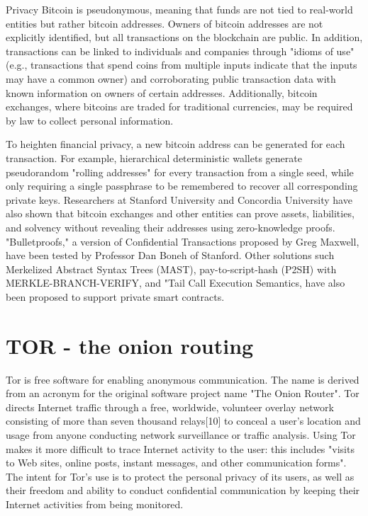 \documentclass[
  digital, %
  table,   %
  lof,     %
  lot,     %
  oneside
]{fithesis3}
\begin{document}
Privacy
Bitcoin is pseudonymous, meaning that funds are not tied to real-world entities but rather bitcoin addresses. Owners of bitcoin addresses are not explicitly identified, but all transactions on the blockchain are public. 
In addition, transactions can be linked to individuals and companies through "idioms of use" (e.g., transactions that spend coins from multiple inputs indicate that
the inputs may have a common owner) and corroborating public transaction data with known information on owners of certain addresses. Additionally, bitcoin exchanges, where bitcoins are traded for traditional
currencies, may be required by law to collect personal information.

To heighten financial privacy, a new bitcoin address can be generated for each transaction. For example, hierarchical deterministic wallets generate pseudorandom "rolling addresses"
for every transaction from a single seed, while only requiring a single passphrase to be remembered to recover all corresponding private keys. Researchers at Stanford University
and Concordia University have also shown that bitcoin exchanges and other entities can prove assets, liabilities, and solvency without revealing their addresses using zero-knowledge proofs.
"Bulletproofs," a version of Confidential Transactions proposed by Greg Maxwell, have been tested by Professor Dan Boneh of Stanford. Other solutions such Merkelized Abstract Syntax Trees (MAST),
pay-to-script-hash (P2SH) with MERKLE-BRANCH-VERIFY, and "Tail Call Execution Semantics, have also been proposed to support private smart contracts.


\section{TOR - the onion routing}
Tor is free software for enabling anonymous communication. The name is derived from an acronym for the original software project name "The Onion Router". 
Tor directs Internet traffic through a free, worldwide, volunteer overlay network consisting of more than seven thousand relays[10] to conceal a user's location
and usage from anyone conducting network surveillance or traffic analysis. Using Tor makes it more difficult to trace Internet activity to the user: this includes 
"visits to Web sites, online posts, instant messages, and other communication forms". The intent for Tor's use is to protect the personal privacy of its users,
as well as their freedom and ability to conduct confidential communication by keeping their Internet activities from being monitored.
\end{document}
